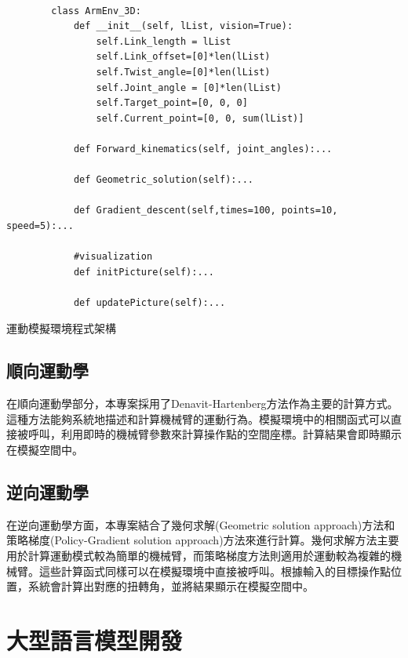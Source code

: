 \documentclass[class=NCU_thesis, crop=false]{standalone}
\begin{document}
\begin{listing}
    \begin{verbatim}

        class ArmEnv_3D:
            def __init__(self, lList, vision=True):
                self.Link_length = lList
                self.Link_offset=[0]*len(lList)
                self.Twist_angle=[0]*len(lList)
                self.Joint_angle = [0]*len(lList)
                self.Target_point=[0, 0, 0]
                self.Current_point=[0, 0, sum(lList)]

            def Forward_kinematics(self, joint_angles):...
            
            def Geometric_solution(self):...

            def Gradient_descent(self,times=100, points=10, speed=5):...

            #visualization
            def initPicture(self):...

            def updatePicture(self):...

    \end{verbatim}
\caption{運動模擬環境程式架構} 
\end{listing}

\subsection{順向運動學}
在順向運動學部分，本專案採用了Denavit-Hartenberg方法作為主要的計算方式。這種方法能夠系統地描述和計算機械臂的運動行為。模擬環境中的相關函式可以直接被呼叫，利用即時的機械臂參數來計算操作點的空間座標。計算結果會即時顯示在模擬空間中。

\subsection{逆向運動學}
在逆向運動學方面，本專案結合了幾何求解(Geometric solution approach)方法和策略梯度(Policy-Gradient solution approach)方法來進行計算。幾何求解方法主要用於計算運動模式較為簡單的機械臂，而策略梯度方法則適用於運動較為複雜的機械臂。這些計算函式同樣可以在模擬環境中直接被呼叫。根據輸入的目標操作點位置，系統會計算出對應的扭轉角，並將結果顯示在模擬空間中。

\section{大型語言模型開發}
\end{document}
